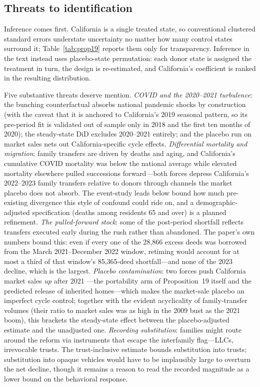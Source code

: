 \documentclass[12pt, letterpaper]{article}
\begin{document}
\subsection{Threats to identification}

Inference comes first. California is a single treated state, so conventional
clustered standard errors understate uncertainty no matter how many control
states surround it; Table~\ref{tab:prop19} reports them only for
transparency. Inference in the text instead uses placebo-state permutation:
each donor state is assigned the treatment in turn, the design is
re-estimated, and California's coefficient is ranked in the resulting
distribution.

Five substantive threats deserve mention. \emph{COVID and the 2020--2021
turbulence}: the bunching counterfactual absorbs national pandemic shocks by
construction (with the caveat that it is anchored to California's 2019
seasonal pattern, so its pre-period fit is validated out of sample only in
2018 and the first ten months of 2020); the steady-state DiD excludes
2020--2021 entirely; and the placebo run on market sales nets out
California-specific cycle effects. \emph{Differential mortality and
migration}: family transfers are driven by deaths and aging, and California's
cumulative COVID mortality was below the national average while elevated
mortality elsewhere pulled successions forward---both forces depress
California's 2022--2023 family transfers relative to donors through channels
the market placebo does not absorb. The event-study leads below bound how
much pre-existing divergence this style of confound could ride on, and a
demographic-adjusted specification (deaths among residents 65 and over) is a
planned refinement. \emph{The pulled-forward stock}: some of the post-period
shortfall reflects transfers executed early during the rush rather than
abandoned. The paper's own numbers bound this: even if every one of the
28,866 excess deeds was borrowed from the March 2021--December 2022 window,
retiming would account for at most a third of that window's 85,365-deed
shortfall---and none of the 2023 decline, which is the largest. \emph{Placebo
contamination}: two forces push California market sales \emph{up} after 2021
---the portability arm of Proposition~19 itself and the predicted release of
inherited homes---which makes the market-sale placebo an imperfect cycle
control; together with the evident acyclicality of family-transfer volumes
(their ratio to market sales was as high in the 2009 bust as the 2021 boom),
this brackets the steady-state effect between the placebo-adjusted estimate
and the unadjusted one. \emph{Recording substitution}: families might route
around the reform via instruments that escape the interfamily flag---LLCs,
irrevocable trusts. The trust-inclusive estimate bounds substitution into
trusts; substitution into opaque vehicles would have to be implausibly large
to overturn the net decline, though it remains a reason to read the recorded
magnitude as a lower bound on the behavioral response.
\end{document}
